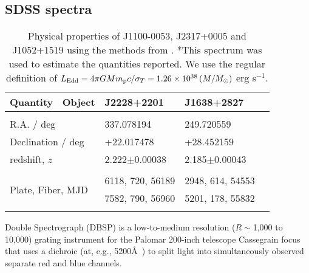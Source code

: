 \documentclass[a4paper,fleqn,usenatbib]{mnras}
\begin{document}
\subsection{SDSS spectra}
\begin{table}
 \centering
 \begin{tabular}{l l l l}
  \hline \hline 
   Quantity \ Object                           & J2228+2201     &  J1638+2827 \\
 \hline 
    &&\\
    R.A. / deg                                        &    337.078194      &  249.720559\\
    Declination / deg                            &    +22.017478      &  +28.452159 \\
    redshift, $z$                                    &   2.222$\pm$0.00038   &  2.185$\pm$0.00043          \\
    &&\\ 
    \multirow{2}{*}{Plate, Fiber, MJD}   & 6118, 720, 56189	     &  2948, 614, 54553	  \\
                                         & 7582, 790, 56960	     & 5201, 178, 55832 \\    
    &&\\
    \hline \hline 
  \end{tabular}
  \caption{Physical properties of J1100-0053, J2317+0005 and J1052+1519 using the
    methods from \citet{Shen2011}. *This spectrum was used to estimate
    the quantities reported.  We use the regular definition of $L_{\rm
      Edd} = 4 \pi G M m_{\rm p} c /\sigma_{T} =
    1.26\times10^{38}\left (M/M_{\odot} \right )$ erg s$^{-1}$.} 
 \label{tab:Shen_props}
\end{table}

Double Spectrograph (DBSP) is a low-to-medium resolution ($R\sim$1,000
to 10,000) grating instrument for the Palomar 200-inch telescope
Cassegrain focus that uses a dichroic (at, e.g., 5200\AA\ ) to split
light into simultaneously observed separate red and blue channels. 
\end{document}
